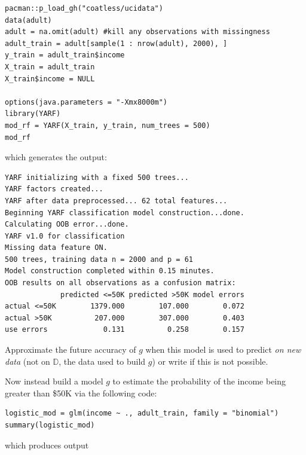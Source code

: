 \documentclass[12pt]{article}
\begin{document}
\begin{lstlisting}
pacman::p_load_gh("coatless/ucidata")
data(adult)
adult = na.omit(adult) #kill any observations with missingness
adult_train = adult[sample(1 : nrow(adult), 2000), ]
y_train = adult_train$income
X_train = adult_train
X_train$income = NULL

options(java.parameters = "-Xmx8000m")
library(YARF)
mod_rf = YARF(X_train, y_train, num_trees = 500)
mod_rf
\end{lstlisting}

\noindent which generates the output:

\footnotesize
\begin{verbatim}
YARF initializing with a fixed 500 trees...
YARF factors created...
YARF after data preprocessed... 62 total features...
Beginning YARF classification model construction...done.
Calculating OOB error...done.
YARF v1.0 for classification
Missing data feature ON.
500 trees, training data n = 2000 and p = 61 
Model construction completed within 0.15 minutes.
OOB results on all observations as a confusion matrix:
             predicted <=50K predicted >50K model errors
actual <=50K        1379.000        107.000        0.072
actual >50K          207.000        307.000        0.403
use errors             0.131          0.258        0.157
\end{verbatim}
\normalsize

\benum

  Approximate the future accuracy of $g$ when this model is used to predict \textit{on new data} (not on $\mathbb{D}$, the data used to build $g$) or write  if this is not possible.


Now instead build a model $g$ to estimate the probability of the income being greater than \$50K via the following code:\\

\begin{lstlisting}
logistic_mod = glm(income ~ ., adult_train, family = "binomial")
summary(logistic_mod)
\end{lstlisting}

which produces output
\end{document}
